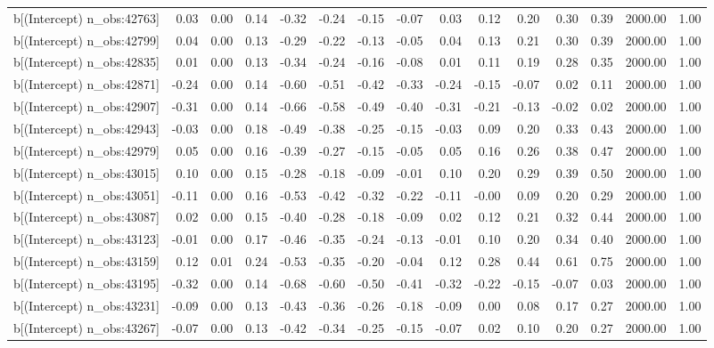 \begin{table}[ht]
\begin{tabular}{rrrrrrrrrrrrrrr}
  b[(Intercept) n\_obs:42763] & 0.03 & 0.00 & 0.14 & -0.32 & -0.24 & -0.15 & -0.07 & 0.03 & 0.12 & 0.20 & 0.30 & 0.39 & 2000.00 & 1.00 \\ 
  b[(Intercept) n\_obs:42799] & 0.04 & 0.00 & 0.13 & -0.29 & -0.22 & -0.13 & -0.05 & 0.04 & 0.13 & 0.21 & 0.30 & 0.39 & 2000.00 & 1.00 \\ 
  b[(Intercept) n\_obs:42835] & 0.01 & 0.00 & 0.13 & -0.34 & -0.24 & -0.16 & -0.08 & 0.01 & 0.11 & 0.19 & 0.28 & 0.35 & 2000.00 & 1.00 \\ 
  b[(Intercept) n\_obs:42871] & -0.24 & 0.00 & 0.14 & -0.60 & -0.51 & -0.42 & -0.33 & -0.24 & -0.15 & -0.07 & 0.02 & 0.11 & 2000.00 & 1.00 \\ 
  b[(Intercept) n\_obs:42907] & -0.31 & 0.00 & 0.14 & -0.66 & -0.58 & -0.49 & -0.40 & -0.31 & -0.21 & -0.13 & -0.02 & 0.02 & 2000.00 & 1.00 \\ 
  b[(Intercept) n\_obs:42943] & -0.03 & 0.00 & 0.18 & -0.49 & -0.38 & -0.25 & -0.15 & -0.03 & 0.09 & 0.20 & 0.33 & 0.43 & 2000.00 & 1.00 \\ 
  b[(Intercept) n\_obs:42979] & 0.05 & 0.00 & 0.16 & -0.39 & -0.27 & -0.15 & -0.05 & 0.05 & 0.16 & 0.26 & 0.38 & 0.47 & 2000.00 & 1.00 \\ 
  b[(Intercept) n\_obs:43015] & 0.10 & 0.00 & 0.15 & -0.28 & -0.18 & -0.09 & -0.01 & 0.10 & 0.20 & 0.29 & 0.39 & 0.50 & 2000.00 & 1.00 \\ 
  b[(Intercept) n\_obs:43051] & -0.11 & 0.00 & 0.16 & -0.53 & -0.42 & -0.32 & -0.22 & -0.11 & -0.00 & 0.09 & 0.20 & 0.29 & 2000.00 & 1.00 \\ 
  b[(Intercept) n\_obs:43087] & 0.02 & 0.00 & 0.15 & -0.40 & -0.28 & -0.18 & -0.09 & 0.02 & 0.12 & 0.21 & 0.32 & 0.44 & 2000.00 & 1.00 \\ 
  b[(Intercept) n\_obs:43123] & -0.01 & 0.00 & 0.17 & -0.46 & -0.35 & -0.24 & -0.13 & -0.01 & 0.10 & 0.20 & 0.34 & 0.40 & 2000.00 & 1.00 \\ 
  b[(Intercept) n\_obs:43159] & 0.12 & 0.01 & 0.24 & -0.53 & -0.35 & -0.20 & -0.04 & 0.12 & 0.28 & 0.44 & 0.61 & 0.75 & 2000.00 & 1.00 \\ 
  b[(Intercept) n\_obs:43195] & -0.32 & 0.00 & 0.14 & -0.68 & -0.60 & -0.50 & -0.41 & -0.32 & -0.22 & -0.15 & -0.07 & 0.03 & 2000.00 & 1.00 \\ 
  b[(Intercept) n\_obs:43231] & -0.09 & 0.00 & 0.13 & -0.43 & -0.36 & -0.26 & -0.18 & -0.09 & 0.00 & 0.08 & 0.17 & 0.27 & 2000.00 & 1.00 \\ 
  b[(Intercept) n\_obs:43267] & -0.07 & 0.00 & 0.13 & -0.42 & -0.34 & -0.25 & -0.15 & -0.07 & 0.02 & 0.10 & 0.20 & 0.27 & 2000.00 & 1.00 \\ 

\end{tabular}
\end{table}
